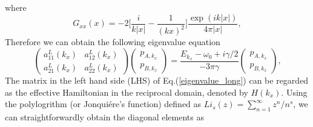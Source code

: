 \documentclass[aps,pra,reprint,groupedaddress,nofootinbib,longbibliography,showpacs]{revtex4-1}
\begin{document}
where 
\begin{equation}\label{gxxeq}
G_{xx}(x)=-2\Big[\frac{i}{k|x|}-\frac{1}{(kx)^2}\Big]\frac{\exp{(ik|x|)}}{4\pi |x|},
\end{equation}
Therefore we can obtain the following eigenvalue equation
\begin{equation}\label{eigenvalue_long}
\left(\begin{matrix}
a_{11}^{L}(k_x) & a_{12}^{L}(k_x)\\
a_{21}^{L}(k_x) & a_{22}^{L}(k_x)
\end{matrix}\right)\left(\begin{matrix}p_{A,k_x}\\p_{B,k_x}\end{matrix}\right)=\frac{E_{k_x}-\omega_0 + i \gamma/2}{-3\pi\gamma}\left(\begin{matrix}p_{A,k_x}\\p_{B,k_x}\end{matrix}\right),
\end{equation}
The matrix in the left hand side (LHS) of Eq.(\ref{eigenvalue_long}) can be regarded as the effective Hamiltonian in the reciprocal domain, denoted by $H(k_x)$. Using the polylogrithm (or Jonqui\'ere's function) defined as $Li_s(z)=\sum_{n=1}^\infty z^n/n^s$, we can straightforwardly obtain the diagonal elements as
\end{document}
